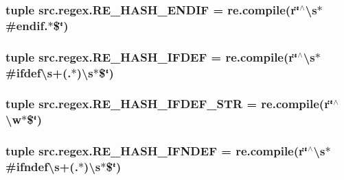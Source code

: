 \hypertarget{namespacesrc_1_1regex_a7087d9e02abfe787381eace18029064a}{
\subsubsection[{R\-E\-\_\-\-H\-A\-S\-H\-\_\-\-E\-N\-D\-I\-F}]{\setlength{\rightskip}{0pt plus 5cm}tuple src.\-regex.\-R\-E\-\_\-\-H\-A\-S\-H\-\_\-\-E\-N\-D\-I\-F = re.\-compile(r\char`\"{}$^\wedge$\textbackslash{}s$\ast$\#endif.$\ast$\$\char`\"{})}}\label{namespacesrc_1_1regex_a7087d9e02abfe787381eace18029064a}
\hypertarget{namespacesrc_1_1regex_a03f6feb4b0ad6bda36e1d7c0878c30fe}{
\subsubsection[{R\-E\-\_\-\-H\-A\-S\-H\-\_\-\-I\-F\-D\-E\-F}]{\setlength{\rightskip}{0pt plus 5cm}tuple src.\-regex.\-R\-E\-\_\-\-H\-A\-S\-H\-\_\-\-I\-F\-D\-E\-F = re.\-compile(r\char`\"{}$^\wedge$\textbackslash{}s$\ast$\#ifdef\textbackslash{}s+(.$\ast$)\textbackslash{}s$\ast$\$\char`\"{})}}\label{namespacesrc_1_1regex_a03f6feb4b0ad6bda36e1d7c0878c30fe}
\hypertarget{namespacesrc_1_1regex_aa29208a089924b6ca6de77d0ce260a38}{
\subsubsection[{R\-E\-\_\-\-H\-A\-S\-H\-\_\-\-I\-F\-D\-E\-F\-\_\-\-S\-T\-R}]{\setlength{\rightskip}{0pt plus 5cm}tuple src.\-regex.\-R\-E\-\_\-\-H\-A\-S\-H\-\_\-\-I\-F\-D\-E\-F\-\_\-\-S\-T\-R = re.\-compile(r\char`\"{}$^\wedge$\textbackslash{}w$\ast$\$\char`\"{})}}\label{namespacesrc_1_1regex_aa29208a089924b6ca6de77d0ce260a38}
\hypertarget{namespacesrc_1_1regex_aa500c35a7c6e04a69cab83aea86afccf}{
\subsubsection[{R\-E\-\_\-\-H\-A\-S\-H\-\_\-\-I\-F\-N\-D\-E\-F}]{\setlength{\rightskip}{0pt plus 5cm}tuple src.\-regex.\-R\-E\-\_\-\-H\-A\-S\-H\-\_\-\-I\-F\-N\-D\-E\-F = re.\-compile(r\char`\"{}$^\wedge$\textbackslash{}s$\ast$\#ifndef\textbackslash{}s+(.$\ast$)\textbackslash{}s$\ast$\$\char`\"{})}}\label{namespacesrc_1_1regex_aa500c35a7c6e04a69cab83aea86afccf}
